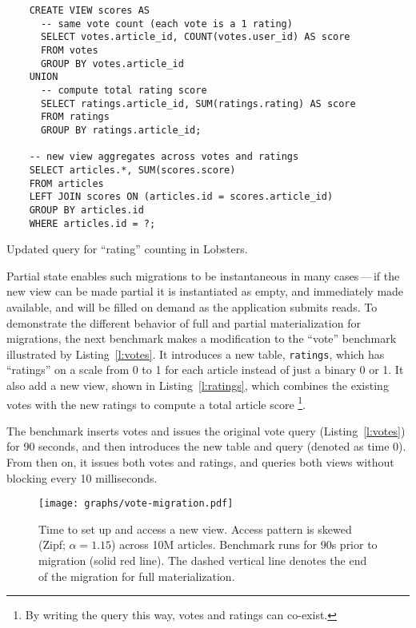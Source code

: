 \begin{listing}[h]
  \begin{verbatim}
    CREATE VIEW scores AS
      -- same vote count (each vote is a 1 rating)
      SELECT votes.article_id, COUNT(votes.user_id) AS score
      FROM votes
      GROUP BY votes.article_id
    UNION
      -- compute total rating score
      SELECT ratings.article_id, SUM(ratings.rating) AS score
      FROM ratings
      GROUP BY ratings.article_id;

    -- new view aggregates across votes and ratings
    SELECT articles.*, SUM(scores.score)
    FROM articles
    LEFT JOIN scores ON (articles.id = scores.article_id)
    GROUP BY articles.id
    WHERE articles.id = ?;
  \end{verbatim}
  \caption{Updated query for ``rating'' counting in Lobsters.}
  \label{l:ratings}
\end{listing}

Partial state enables such migrations to be instantaneous in many cases\,---\,if
the new view can be made partial it is instantiated as empty, and immediately
made available, and will be filled on demand as the application submits reads.
To demonstrate the different behavior of full and partial materialization for
migrations, the next benchmark makes a modification to the ``vote'' benchmark
illustrated by Listing~\ref{l:votes}. It introduces a new table,
\texttt{ratings}, which has ``ratings'' on a scale from 0 to 1 for each article
instead of just a binary 0 or 1. It also add a new view, shown in
Listing~\ref{l:ratings}, which combines the existing votes with the new ratings
to compute a total article score%
\footnote{By writing the query this way, votes and ratings can co-exist.}.

The benchmark inserts votes and issues the original vote query
(Listing~\ref{l:votes}) for 90 seconds, and then introduces the new table and
query (denoted as time 0). From then on, it issues both votes and ratings, and
queries both views without blocking every 10 milliseconds.

\begin{figure}[h]
  \centering
  \texttt{[image: graphs/vote-migration.pdf]}
  \caption{Time to set up and access a new view. Access pattern is skewed (Zipf;
  $\alpha = 1.15$) across 10M articles. Benchmark runs for 90s prior to
  migration (solid red line). The dashed vertical line denotes the end of the
  migration for full materialization.}
  \label{f:vote-migration}
\end{figure}


